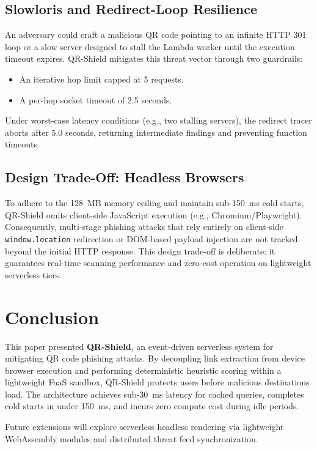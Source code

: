\documentclass[10pt,conference,letterpaper]{IEEEtran}
\begin{document}
\subsection{Slowloris and Redirect-Loop Resilience}
An adversary could craft a malicious QR code pointing to an infinite HTTP 301 loop or a slow server designed to stall the Lambda worker until the execution timeout expires. QR-Shield mitigates this threat vector through two guardrails:
\begin{itemize}
    \item An iterative hop limit capped at 5 requests.
    \item A per-hop socket timeout of 2.5 seconds.
\end{itemize}
Under worst-case latency conditions (e.g., two stalling servers), the redirect tracer aborts after 5.0 seconds, returning intermediate findings and preventing function timeouts.

\subsection{Design Trade-Off: Headless Browsers}
To adhere to the 128~MB memory ceiling and maintain sub-150~ms cold starts, QR-Shield omits client-side JavaScript execution (e.g., Chromium/Playwright). Consequently, multi-stage phishing attacks that rely entirely on client-side \texttt{window.location} redirection or DOM-based payload injection are not tracked beyond the initial HTTP response. This design trade-off is deliberate: it guarantees real-time scanning performance and zero-cost operation on lightweight serverless tiers.

\section{Conclusion}
This paper presented \textbf{QR-Shield}, an event-driven serverless system for mitigating QR code phishing attacks. By decoupling link extraction from device browser execution and performing deterministic heuristic scoring within a lightweight FaaS sandbox, QR-Shield protects users before malicious destinations load. The architecture achieves sub-30~ms latency for cached queries, completes cold starts in under 150~ms, and incurs zero compute cost during idle periods. 

Future extensions will explore serverless headless rendering via lightweight WebAssembly modules and distributed threat feed synchronization.
\end{document}
